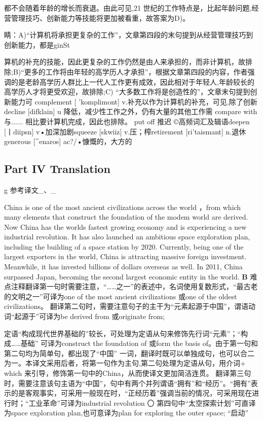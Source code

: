 \documentclass[UTF8,11pt]{ctexart}
\begin{document}
都不会随着年龄的增长而衰退。由此可见,21 世纪的工作特点是，比起年龄问题,经营管理技巧、创新能力等技能将更加被看重，故答案为D)。


睛：A)“计算机将承担更复杂的工作”，文章第四段的末句提到从经营管理技巧到创新能力，都是ginSt


算机的补充的技能，因此更复杂的工作仍然是由人来承担的，而非计算机，故排除;B)“更多的工作将由年轻的高学历人才承担”，根据文章第四段的内容，作者强调的是老龄高学历人群比上一代人工作更有成效，因此相对于年轻人,年龄较长的高学历人才将更受欢迎，故排除;C) “大多数工作将是创造性的”，文章末句提到创新能力可 complement [ 'komplimont] v.补充以作为计算机的补充，可见,除了创新 decline [difklain] u 降低，减少性工作之外，仍有大量的其他工作需 compare with 与...... 相比要计算机完成，因此也排除。 put off 推迟 ©高频词汇及辑语deepen [丨diipsn] v•加深加剧squeeze [skwiiz] v.压；榨retirement [ri'taismant] n.退休generous [\textasciicircum{}enaros] ac?/•慷慨的，大方的


\subsection*{Part IV Translation}


g 参考译文\_、\_


China is one of the most ancient civilizations across the world ，from which many elements that construct the foundation of the modem world are derived. Now China has the worlds fastest growing economy and is experiencing a new industrial revolution. It has also launched an ambitious space exploration plan, including the building of a space station by 2020. Currently, being one of the largest exporters in the world, China is attracting massive foreign investment. Meanwhile, it has invested billions of dollars overseas as well. In 2011, China surpassed Japan, becoming the second largest economic entity in the world. \textbf{B} 难点注释翻译第一句时需要注意，“……之一”的表述中，名词使用复数形式，“最古老的文明之一”可译为one of the most ancient civilizations 或one of the oldest civilizations。 翻译第二句时，需要注意句子的主干为“元素起源于中国”，谓语动词“起源于”可译为be derived from 或originate from;


定语“构成现代世界基础的”较长，可处理为定语从句来修饰先行词“元素”；“构成……基础” 可译为construct the foundation of 或form the basis of。由于第一句和第二句均为简单句，都出现了“中国” 一词，翻译时既可以单独成句，也可以合二为一。本译文采用后者，将第一句作为主句,第二句处理为定语从句，用介词+ which 来引导，修饰第一句中的China，从而使译文更加简洁连贯。 翻译第三句时，需要注意该句主语为“中国”，句中有两个并列谓语“拥有”和“经历”。“拥有”表示的是客观事实，可采用一般现在时，“正经历着”强调当前的情况，可采用现在进行时；“工业革命”可译为industrial revolution 〇 第四句中“太空探索计划”可直译为space exploration plan,也可意译为plan for exploring the outer space; “启动”
\end{document}
